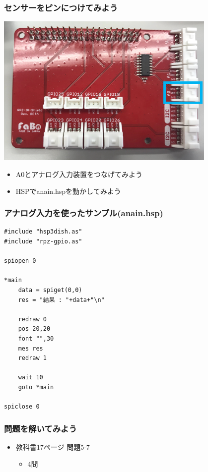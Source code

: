 \begin{frame}
    \frametitle{センサーをピンにつけてみよう}
    \begin{center}
        \includegraphics[width=0.8\textwidth]{images/chap05/text05-img030.png}
        \begin{itemize}
            \item A0とアナログ入力装置をつなげてみよう
            \item HSPでanain.hspを動かしてみよう
        \end{itemize}
    \end{center}
\end{frame}

\begin{frame}[fragile]
    \frametitle{アナログ入力を使ったサンプル(anain.hsp)}
\begin{lstlisting}
#include "hsp3dish.as"
#include "rpz-gpio.as"

spiopen 0

*main
	data = spiget(0,0)
	res = "結果 : "+data+"\n"

	redraw 0
	pos 20,20
	font "",30
	mes res
	redraw 1

	wait 10
	goto *main

spiclose 0
\end{lstlisting}
\end{frame}

\begin{frame}[fragile]
    \frametitle{問題を解いてみよう}
    \begin{itemize}
        \item 教科書17ページ 問題5-7
        \begin{itemize}
            \item 4問
        \end{itemize}
    \end{itemize}
\end{frame}
